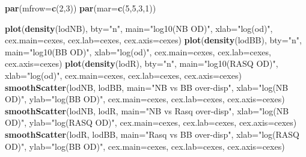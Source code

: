 \documentclass[]{article}
\newenvironment{Shaded}{\begin{snugshade}}{\end{snugshade}}
\newcommand{\KeywordTok}[1]{\textcolor[rgb]{0.13,0.29,0.53}{\textbf{#1}}}
\newcommand{\DataTypeTok}[1]{\textcolor[rgb]{0.13,0.29,0.53}{#1}}
\newcommand{\DecValTok}[1]{\textcolor[rgb]{0.00,0.00,0.81}{#1}}
\newcommand{\StringTok}[1]{\textcolor[rgb]{0.31,0.60,0.02}{#1}}
\newcommand{\NormalTok}[1]{#1}
\begin{document}
\begin{Shaded}
\begin{Highlighting}[]
\KeywordTok{par}\NormalTok{(}\DataTypeTok{mfrow=}\KeywordTok{c}\NormalTok{(}\DecValTok{2}\NormalTok{,}\DecValTok{3}\NormalTok{))}
\KeywordTok{par}\NormalTok{(}\DataTypeTok{mar=}\KeywordTok{c}\NormalTok{(}\DecValTok{5}\NormalTok{,}\DecValTok{5}\NormalTok{,}\DecValTok{3}\NormalTok{,}\DecValTok{1}\NormalTok{))}

\KeywordTok{plot}\NormalTok{(}\KeywordTok{density}\NormalTok{(lodNB), }\DataTypeTok{bty=}\StringTok{"n"}\NormalTok{, }\DataTypeTok{main=}\StringTok{"log10(NB OD)"}\NormalTok{, }\DataTypeTok{xlab=}\StringTok{"log(od)"}\NormalTok{, }\DataTypeTok{cex.main=}\NormalTok{cexes, }\DataTypeTok{cex.lab=}\NormalTok{cexes, }\DataTypeTok{cex.axis=}\NormalTok{cexes)}
\KeywordTok{plot}\NormalTok{(}\KeywordTok{density}\NormalTok{(lodBB), }\DataTypeTok{bty=}\StringTok{"n"}\NormalTok{, }\DataTypeTok{main=}\StringTok{"log10(BB OD)"}\NormalTok{, }\DataTypeTok{xlab=}\StringTok{"log(od)"}\NormalTok{, }\DataTypeTok{cex.main=}\NormalTok{cexes, }\DataTypeTok{cex.lab=}\NormalTok{cexes, }\DataTypeTok{cex.axis=}\NormalTok{cexes)}
\KeywordTok{plot}\NormalTok{(}\KeywordTok{density}\NormalTok{(lodR), }\DataTypeTok{bty=}\StringTok{"n"}\NormalTok{, }\DataTypeTok{main=}\StringTok{"log10(RASQ OD)"}\NormalTok{, }\DataTypeTok{xlab=}\StringTok{"log(od)"}\NormalTok{, }\DataTypeTok{cex.main=}\NormalTok{cexes, }\DataTypeTok{cex.lab=}\NormalTok{cexes, }\DataTypeTok{cex.axis=}\NormalTok{cexes)}
\KeywordTok{smoothScatter}\NormalTok{(lodNB, lodBB, }\DataTypeTok{main=}\StringTok{"NB vs BB over-disp"}\NormalTok{, }\DataTypeTok{xlab=}\StringTok{"log(NB OD)"}\NormalTok{, }\DataTypeTok{ylab=}\StringTok{"log(BB OD)"}\NormalTok{, }\DataTypeTok{cex.main=}\NormalTok{cexes, }\DataTypeTok{cex.lab=}\NormalTok{cexes, }\DataTypeTok{cex.axis=}\NormalTok{cexes)}
\KeywordTok{smoothScatter}\NormalTok{(lodNB, lodR, }\DataTypeTok{main=}\StringTok{"NB vs Rasq over-disp"}\NormalTok{, }\DataTypeTok{xlab=}\StringTok{"log(NB OD)"}\NormalTok{, }\DataTypeTok{ylab=}\StringTok{"log(RASQ OD)"}\NormalTok{, }\DataTypeTok{cex.main=}\NormalTok{cexes, }\DataTypeTok{cex.lab=}\NormalTok{cexes, }\DataTypeTok{cex.axis=}\NormalTok{cexes)}
\KeywordTok{smoothScatter}\NormalTok{(lodR, lodBB, }\DataTypeTok{main=}\StringTok{"Rasq vs BB over-disp"}\NormalTok{, }\DataTypeTok{xlab=}\StringTok{"log(RASQ OD)"}\NormalTok{, }\DataTypeTok{ylab=}\StringTok{"log(BB OD)"}\NormalTok{, }\DataTypeTok{cex.main=}\NormalTok{cexes, }\DataTypeTok{cex.lab=}\NormalTok{cexes, }\DataTypeTok{cex.axis=}\NormalTok{cexes)}
\end{Highlighting}
\end{Shaded}
\end{document}
